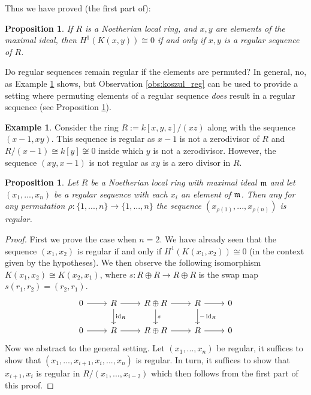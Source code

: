 \documentclass[12pt]{article}
\theoremstyle{plain}
\newtheorem{proposition}[thm]{Proposition}
\theoremstyle{definition}
\newtheorem{example}[thm]{Example}
\newcommand{\lto}{\longrightarrow}
\begin{document}
	Thus we have proved (the first part of):
	\begin{proposition}\label{prop:Zero_KozHom_reg}
		If $R$ is a Noetherian local ring, and $x,y$ are elements of the maximal ideal, then $H^1(K(x,y)) \cong 0$ if and only if $x,y$ is a regular sequence of $R$.
	\end{proposition}
	Do regular sequences remain regular if the elements are permuted? In general, no, as Example \ref{ex:permute_reg} shows, but Observation \ref{obs:koszul_reg} can be used to provide a setting where permuting elements of a regular sequence \emph{does} result in a regular sequence (see Proposition \ref{prop:reg_permute}).
	\begin{example}\label{ex:permute_reg}
		Consider the ring $R := k[x,y,z]/(xz)$ along with the sequence $(x-1,xy)$. This sequence is regular as $x-1$ is not a zerodivisor of $R$ and $R/(x-1) \cong k[y] \not\cong 0$ inside which $y$ is not a zerodivisor. However, the sequence $(xy, x-1)$ is not regular as $xy$ is a zero divisor in $R$.
	\end{example}
	\begin{proposition}\label{prop:reg_permute}
		Let $R$ be a Noetherian local ring with maximal ideal $\frak{m}$ and let $(x_1,...,x_n)$ be a regular sequence with each $x_i$ an element of $\frak{m}$. Then any for any permutation $\rho: \lbrace 1,...,n \rbrace \lto \lbrace 1,...,n \rbrace$ the sequence $(x_{\rho(1)},...,x_{\rho(n)})$ is regular.
	\end{proposition}
	\begin{proof}
		First we prove the case when $n = 2$. We have already seen that the sequence $(x_1,x_2)$ is regular if and only if $H^1(K(x_1,x_2)) \cong 0$ (in the context given by the hypotheses). We then observe the following isomorphism $K(x_1,x_2) \cong K(x_2,x_1)$, where $s: R \oplus R \lto R \oplus R$ is the swap map $s(r_1,r_2) = (r_2,r_1)$.
		\begin{equation}
			\begin{tikzcd}
				0\arrow[r] & R\arrow[r]\arrow[d,"{\operatorname{id}_R}"] & R \oplus R\arrow[r]\arrow[d,"s"] & R\arrow[r]\arrow[d,"{-\operatorname{id}_R}"] & 0\\
				0\arrow[r] & R\arrow[r] & R \oplus R\arrow[r] & R\arrow[r] & 0
			\end{tikzcd}
		\end{equation}
		Now we abstract to the general setting. Let $(x_1,...,x_n)$ be regular, it suffices to show that $(x_1,...,x_{i+1},x_i,..., x_n)$ is regular. In turn, it suffices to show that $x_{i+1},x_i$ is regular in $R/(x_1,...,x_{i-2})$ which then follows from the first part of this proof.
	\end{proof}
\end{document}
